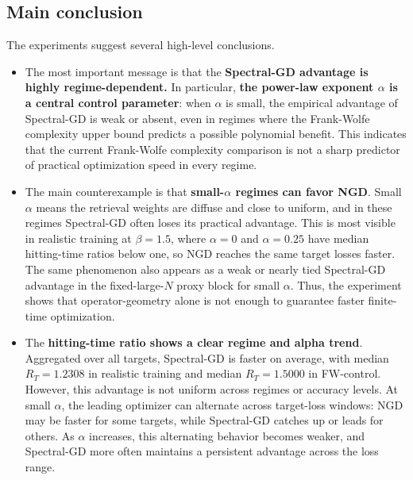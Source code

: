 \documentclass[11pt]{article}
\newcommand{\tratio}{R_T}
\begin{document}
\subsection{Main conclusion}
The experiments suggest several high-level conclusions. 
\begin{itemize}
    \item The most important message is that the \textbf{Spectral-GD advantage is highly regime-dependent.} In particular, \textbf{the power-law exponent $\alpha$ is a central control parameter}: when $\alpha$ is small, the empirical advantage of Spectral-GD is weak or absent, even in regimes where the Frank-Wolfe complexity upper bound predicts a possible polynomial benefit. This indicates that the current Frank-Wolfe complexity comparison is not a sharp predictor of practical optimization speed in every regime.

    \item The main counterexample is that \textbf{small-$\alpha$ regimes can favor NGD}. Small $\alpha$ means the retrieval weights are diffuse and close to uniform, and in these regimes Spectral-GD often loses its practical advantage. This is most visible in realistic training at $\beta=1.5$, where $\alpha=0$ and $\alpha=0.25$ have median hitting-time ratios below one, so NGD reaches the same target losses faster. The same phenomenon also appears as a weak or nearly tied Spectral-GD advantage in the fixed-large-$N$ proxy block for small $\alpha$. Thus, the experiment shows that operator-geometry alone is not enough to guarantee faster finite-time optimization.

    \item The \textbf{hitting-time ratio shows a clear regime and alpha trend}. Aggregated over all targets, Spectral-GD is faster on average, with median $\tratio=1.2308$ in realistic training and median $\tratio=1.5000$ in FW-control. However, this advantage is not uniform across regimes or accuracy levels. At small $\alpha$, the leading optimizer can alternate across target-loss windows: NGD may be faster for some targets, while Spectral-GD catches up or leads for others. As $\alpha$ increases, this alternating behavior becomes weaker, and Spectral-GD more often maintains a persistent advantage across the loss range. 


\end{itemize}
\end{document}
